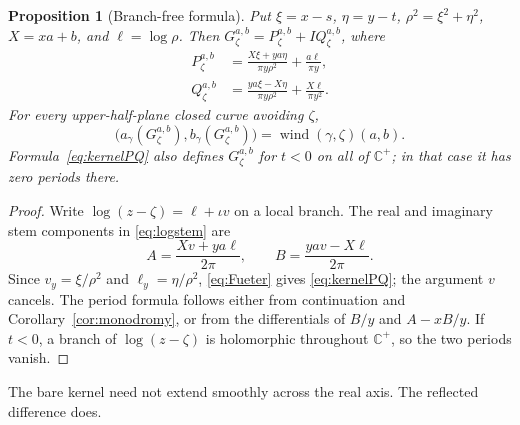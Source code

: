 \documentclass[11pt,a4paper]{article}
\numberwithin{equation}{section}
\newtheorem{proposition}[theorem]{Proposition}
\theoremstyle{definition}
\theoremstyle{remark}
\newcommand{\C}{\mathbb C}
\newcommand{\wind}{\operatorname{wind}}
\begin{document}
\begin{proposition}[Branch-free formula]
\label{prop:kernel}
Put $\xi=x-s$, $\eta=y-t$, $\rho^2=\xi^2+\eta^2$, $X=xa+b$,
and $\ell=\log\rho$. Then $G_\zeta^{a,b}=P_\zeta^{a,b}+I Q_\zeta^{a,b}$,
where
\begin{align}
 P_\zeta^{a,b}
 &=\frac{X\xi+ya\eta}{\pi y\rho^2}+\frac{a\ell}{\pi y},\\
 Q_\zeta^{a,b}
 &=\frac{ya\xi-X\eta}{\pi y\rho^2}+\frac{X\ell}{\pi y^2}.
 \label{eq:kernelPQ}
\end{align}
For every upper-half-plane closed curve avoiding $\zeta$,
\begin{equation}
 \big(a_\gamma(G_\zeta^{a,b}),b_\gamma(G_\zeta^{a,b})\big)
 =\wind(\gamma,\zeta)(a,b).
 \label{eq:kernelperiod}
\end{equation}
Formula~\eqref{eq:kernelPQ} also defines $G_\zeta^{a,b}$ for $t<0$ on
all of $\C^+$; in that case it has zero periods there.
\end{proposition}
\begin{proof}
Write $\log(z-\zeta)=\ell+\iota v$ on a local branch. The real and
imaginary stem components in \eqref{eq:logstem} are
\[
 A=\frac{Xv+ya\ell}{2\pi},\qquad
 B=\frac{yav-X\ell}{2\pi}.
\]
Since $v_y=\xi/\rho^2$ and $\ell_y=\eta/\rho^2$,
\eqref{eq:Fueter} gives \eqref{eq:kernelPQ}; the argument $v$ cancels.
The period formula follows either from continuation and
Corollary~\ref{cor:monodromy}, or from the differentials of $B/y$ and
$A-xB/y$. If $t<0$, a branch of $\log(z-\zeta)$ is holomorphic throughout
$\C^+$, so the two periods vanish.
\end{proof}

The bare kernel need not extend smoothly across the real axis. The
reflected difference does.
\end{document}

